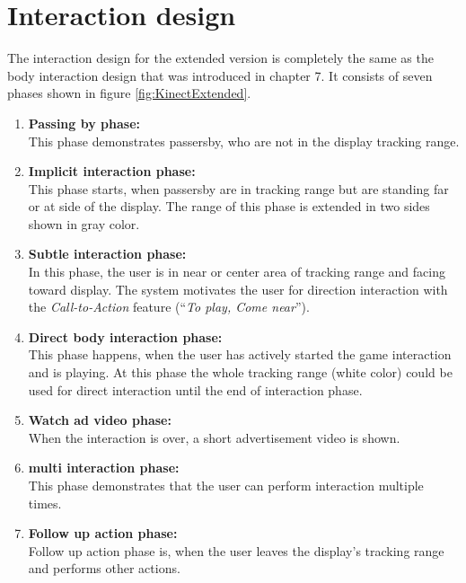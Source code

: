 \section{Interaction design}
The interaction design for the extended version is completely the same as the body interaction design that was introduced in chapter 7. It consists of seven phases shown in figure \ref{fig:KinectExtended}.

\begin{enumerate}
\item \textbf{Passing by phase:} \\
This phase demonstrates passersby, who are not in the display tracking range.

\item \textbf{Implicit interaction phase:} \\
This phase starts, when passersby are in tracking range but are standing far or at side of the display. The range of this phase is extended in two sides shown in gray color.

\item \textbf{Subtle interaction phase:} \\
In this phase, the user is in near or center area of tracking range and facing toward display. The system motivates the user for direction interaction with the \emph{Call-to-Action} feature (``\emph{To play, Come near}'').

\item \textbf{Direct body interaction phase:} \\
This phase happens, when the user has actively started the game interaction and is playing. At this phase the whole tracking range (white color) could be used for direct interaction until the end of interaction phase.

\item \textbf{Watch ad video phase:} \\
When the interaction is over, a short advertisement video is shown.

\item \textbf{multi interaction phase:} \\
This phase demonstrates that the user can perform interaction multiple times.

\item \textbf{Follow up action phase:} \\
Follow up action phase is, when the user leaves the display’s tracking range and performs other actions.
\end{enumerate}


